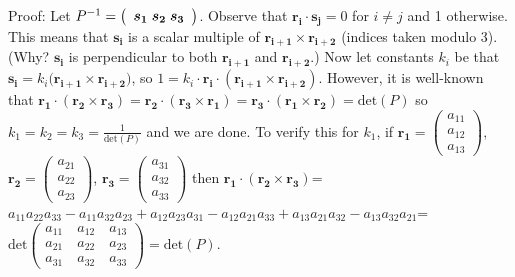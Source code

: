 \documentclass[11pt,a4paper]{article}
\begin{document}
\begin {enumerate}
Proof: Let $P^{-1}=\left(\begin{array}{ccc} \bm{s_1}\thickspace\bm{s_2}\thickspace \bm{s_3}\end{array}\right)$. Observe that $\bm{r_i}\cdot \bm{s_j}=0$ for $i\ne j$ and 1 otherwise. This means that $\bm{s_i}$ is a scalar multiple of $\bm{r_{i+1}}\times \bm{r_{i+2}}$ (indices taken modulo 3). (Why? $\bm{s_i}$ is perpendicular to both $\bm{r_{i+1}}$ and $\bm{r_{i+2}}$.) Now let constants $k_i$ be that $\bm{s_i}=k_i\bm{(r_{i+1}}\times \bm{r_{i+2}})$, so $1=k_i\cdot \bm{r_i}\cdot (\bm{r_{i+1}}\times \bm{r_{i+2}})$. However, it is well-known that $\bm{r_1}\cdot (\bm{r_2}\times \bm{r_3})=\bm{r_2}\cdot (\bm{r_3}\times \bm{r_1})=\bm{r_3}\cdot (\bm{r_1}\times \bm{r_2})=\text{det}(P)$ so $k_1=k_2=k_3=\frac{1}{\text{det}(P)}$ and we are done. To verify this for $k_1$, if $\bm{r_1}=\left(\begin{array}{c} a_{11}\\a_{12}\\a_{13}\end{array}\right),$ $\bm{r_2}=\left(\begin{array}{c} a_{21}\\a_{22}\\a_{23}\end{array}\right)$, $\bm{r_3}=\left(\begin{array}{c} a_{31}\\a_{32}\\a_{33}\end{array}\right)$ then $\bm{r_1}\cdot (\bm{r_2}\times \bm{r_3})$=$a_{11}a_{22}a_{33}-a_{11}a_{32}a_{23}+a_{12}a_{23}a_{31}-a_{12}a_{21}a_{33}+a_{13}a_{21}a_{32}-a_{13}a_{32}a_{21}$=$\text{det}\left(\begin{array}{ccc}a_{11}\quad a_{12}\quad a_{13}\\ a_{21}\quad a_{22}\quad a_{23}\\a_{31}\quad a_{32}\quad a_{33}\end{array}\right)=\text{det}(P).$


\end{enumerate}
\end{document}
